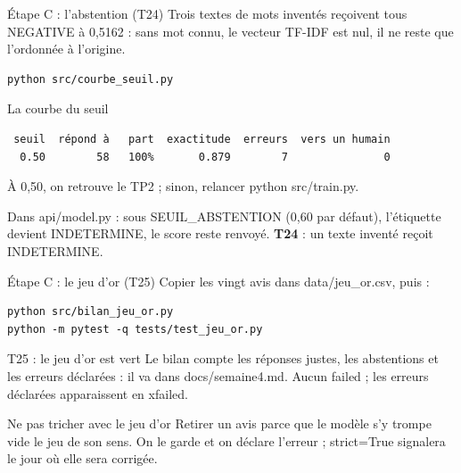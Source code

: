 \documentclass[aspectratio=169,11pt]{beamer}
\newcommand{\co}[1]{{\ttfamily\hyphenchar\font=45\relax #1}}
\begin{document}
\begin{frame}[fragile]{Étape C : l'abstention (T24)}
\small Trois textes de mots inventés reçoivent tous \co{NEGATIVE} à 0,5162 : sans mot connu, le vecteur TF-IDF
est nul, il ne reste que l'ordonnée à l'origine.
\begin{lstlisting}
python src/courbe_seuil.py
\end{lstlisting}
\begin{exampleblock}{La courbe du seuil}
\vspace{-2pt}
\begin{lstlisting}
 seuil  répond à   part  exactitude  erreurs  vers un humain
  0.50        58   100%       0.879        7               0
\end{lstlisting}
À 0,50, on retrouve le TP2 ; sinon, relancer \co{python src/train.py}.
\end{exampleblock}
\small Dans \co{api/model.py} : sous \co{SEUIL\_ABSTENTION} (0,60 par défaut), l'étiquette devient
\co{INDETERMINE}, le score reste renvoyé. \textbf{T24} : un texte inventé reçoit \co{INDETERMINE}.
\end{frame}

\begin{frame}[fragile]{Étape C : le jeu d'or (T25)}
\small Copier les vingt avis dans \co{data/jeu\_or.csv}, puis :
\begin{lstlisting}
python src/bilan_jeu_or.py
python -m pytest -q tests/test_jeu_or.py
\end{lstlisting}
\begin{exampleblock}{T25 : le jeu d'or est vert}
Le bilan compte les réponses justes, les abstentions et les erreurs déclarées : il va dans
\co{docs/semaine4.md}. Aucun \co{failed} ; les erreurs déclarées apparaissent en \co{xfailed}.
\end{exampleblock}
\begin{alertblock}{Ne pas tricher avec le jeu d'or}
Retirer un avis parce que le modèle s'y trompe vide le jeu de son sens. On le garde et on déclare l'erreur ;
\co{strict=True} signalera le jour où elle sera corrigée.
\end{alertblock}
\end{frame}
\end{document}
